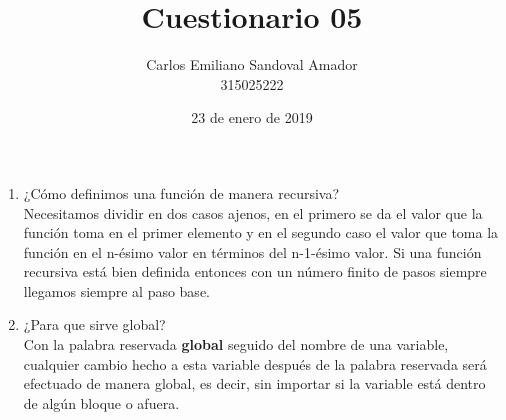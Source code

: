 \documentclass[letterpaper, 12pt, oneside]{article}%
\title{Cuestionario 05}
\author{Carlos Emiliano Sandoval Amador \\ 315025222}
\date{23 de enero de 2019}
\begin{document}
	\maketitle
	\begin{enumerate}
		\item ¿Cómo definimos una función de manera recursiva? \\ Necesitamos dividir en dos casos ajenos, en el primero se da el valor que la función toma en el primer elemento y en el segundo caso el valor que toma la función en el n-ésimo valor en términos del n-1-ésimo valor. Si una función recursiva está bien definida entonces con un número finito de pasos siempre llegamos siempre al paso base.
		\item ¿Para que sirve global? \\ Con la palabra reservada \textbf{global} seguido del nombre de una variable, cualquier cambio hecho a esta variable después de la palabra reservada será efectuado de manera global, es decir, sin importar si la variable está dentro de algún bloque o afuera.
		
	\end{enumerate}
\end{document}
